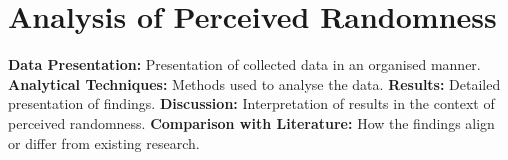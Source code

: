 \section{Analysis of Perceived Randomness}\label{section:analysis_of_perceived_randomness}
\textbf{Data Presentation:} Presentation of collected data in an organised manner.\newline
\textbf{Analytical Techniques:} Methods used to analyse the data.\newline
\textbf{Results:} Detailed presentation of findings.\newline
\textbf{Discussion:} Interpretation of results in the context of perceived randomness.\newline
\textbf{Comparison with Literature:} How the findings align or differ from existing research.\newline